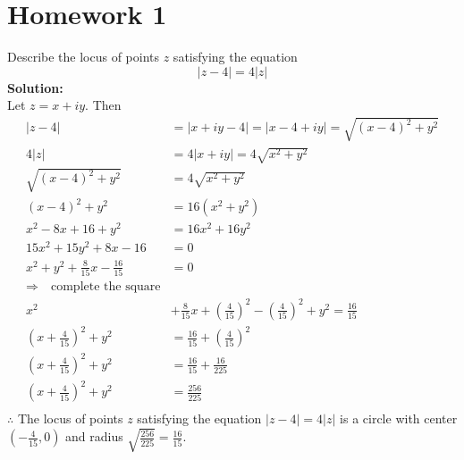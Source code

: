 \chapter{Homework 1}

\begin{example}
     Describe the locus of points $z$ satisfying the equation
    \[|z-4|=4|z|\]
    \textbf{Solution:} \\
    Let $z=x+iy$. Then
    \begin{align*}
        |z-4|                                     & = |x+iy-4| = |x-4+iy| = \sqrt{(x-4)^2+y^2}                                   \\
        4|z|                                      & = 4|x+iy| = 4\sqrt{x^2+y^2}                                                  \\
        \sqrt{(x-4)^2+y^2}                        & = 4\sqrt{x^2+y^2}                                                            \\
        (x-4)^2+y^2                               & = 16(x^2+y^2)                                                                \\
        x^2-8x+16+y^2                             & = 16x^2+16y^2                                                                \\
        15x^2+15y^2+8x-16                         & = 0                                                                          \\
        x^2 + y^2 + \frac{8}{15}x - \frac{16}{15} & = 0                                                                          \\
        \Rightarrow \quad \text{complete the square}                                                                             \\
        x^2                                       & + \frac{8}{15}x + (\frac{4}{15})^2 - (\frac{4}{15})^2 + y^2  = \frac{16}{15} \\
        (x+\frac{4}{15})^2 + y^2                  & = \frac{16}{15} + (\frac{4}{15})^2                                           \\
        (x+\frac{4}{15})^2 + y^2                  & = \frac{16}{15} + \frac{16}{225}                                             \\
        (x+\frac{4}{15})^2 + y^2                  & = \frac{256}{225}                                                            \\
    \end{align*}
    $\therefore$ The locus of points $z$ satisfying the equation $|z-4|=4|z|$ is a circle with center $(-\frac{4}{15},0)$ and radius $\sqrt{\frac{256}{225}} = \frac{16}{15}$.
\end{example}

